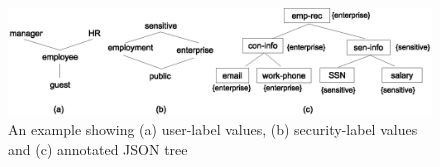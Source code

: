   	\begin{figure} [t]
 		\centering
 		\includegraphics[width=1\textwidth]{NSS16/operational-explanation}
 		\caption{An example showing (a) user-label values, (b) security-label values and (c)  annotated JSON tree}
 		\label{fig:operational-explanation}
 	\end{figure}
 